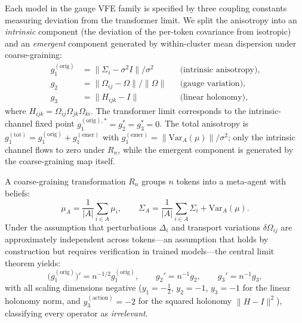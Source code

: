 \documentclass[twoside,11pt]{article}
\begin{document}
Each model in the gauge VFE family is specified by three coupling constants measuring deviation from the transformer limit. We split the anisotropy into an \emph{intrinsic} component (the deviation of the per-token covariance from isotropic) and an \emph{emergent} component generated by within-cluster mean dispersion under coarse-graining:
\begin{align}
g_1^{(\mathrm{orig})} &= \|\Sigma_i - \sigma^2 I\| / \sigma^2 & &\text{(intrinsic anisotropy)}, \label{eq:g1_def} \\
g_2 &= \|\Omega_{ij} - \Omega\| / \|\Omega\| & &\text{(gauge variation)}, \label{eq:g2_def} \\
g_3 &= \|H_{ijk} - I\| & &\text{(linear holonomy)}, \label{eq:g3_def}
\end{align}
where $H_{ijk} = \Omega_{ij} \Omega_{jk} \Omega_{ki}$. The transformer limit corresponds to the intrinsic-channel fixed point $g_1^{(\mathrm{orig}),*} = g_2^* = g_3^* = 0$. The total anisotropy is $g_1^{(\mathrm{tot})} = g_1^{(\mathrm{orig})} + g_1^{(\mathrm{emer})}$ with $g_1^{(\mathrm{emer})} = \|\mathrm{Var}_A(\mu)\|/\sigma^2$; only the intrinsic channel flows to zero under $R_n$, while the emergent component is generated by the coarse-graining map itself.

A coarse-graining transformation $R_n$ groups $n$ tokens into a meta-agent with beliefs:
\begin{equation}
\mu_A = \frac{1}{|A|} \sum_{i \in A} \mu_i, \qquad
\Sigma_A = \frac{1}{|A|} \sum_{i \in A} \Sigma_i + \mathrm{Var}_A(\mu).
\label{eq:meta_agent_beliefs}
\end{equation}
Under the assumption that perturbations $\Delta_i$ and transport variations $\delta\Omega_{ij}$ are approximately independent across tokens---an assumption that holds by construction but requires verification in trained models---the central limit theorem yields:
\begin{equation}
\bigl(g_1^{(\mathrm{orig})}\bigr)' = n^{-1/2} g_1^{(\mathrm{orig})}, \qquad g_2' = n^{-1} g_2, \qquad g_3' = n^{-1} g_3,
\label{eq:rg_scaling}
\end{equation}
with all scaling dimensions negative ($y_1 = -\tfrac{1}{2}$, $y_2 = -1$, $y_3 = -1$ for the linear holonomy norm, and $y_3^{(\mathrm{action})} = -2$ for the squared holonomy $\|H-I\|^2$), classifying every operator as \emph{irrelevant}.
\end{document}
